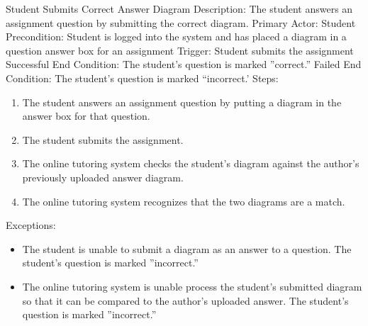     \begin{section}{Student Submits Correct Answer Diagram}
        Description: The student answers an assignment question by submitting the correct diagram. \newline
        Primary Actor: Student \newline
        Precondition: Student is logged into the system and has placed a diagram in a question answer box for an assignment \newline  
        Trigger: Student submits the assignment \newline
        Successful End Condition: The student's question is marked ''correct.'' \newline
        Failed End Condition: The student's question is marked “incorrect.' \newline
        \newline
        Steps:
        \begin{enumerate}
            \item{The student answers an assignment question by putting a diagram in the answer box for that question.}
            \item{The student submits the assignment.}
            \item{The online tutoring system checks the student's diagram against the author's previously uploaded answer diagram.}
            \item{The online tutoring system recognizes that the two diagrams are a match.}
        \end{enumerate}
        Exceptions:
        \begin{itemize}
            \item{The student is unable to submit a diagram as an answer to a question.  The student's question is marked ''incorrect.''}  
            \item{The online tutoring system is unable process the student's submitted diagram so that it can be 
            compared to the author's uploaded answer.  The student's question is marked ''incorrect.''}
        \end{itemize}
    \end{section}
    
